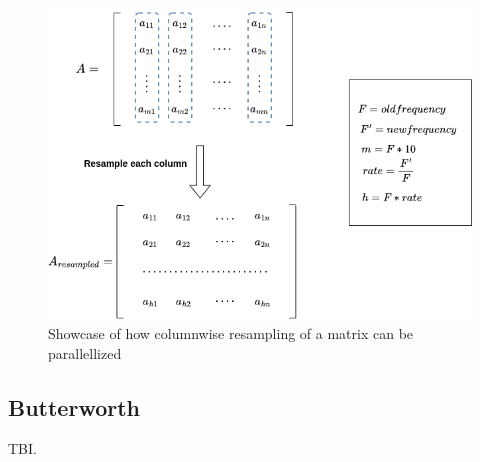 \begin{figure}[h]
    \centering
    \includegraphics[width=0.8\linewidth]{figures/parallel_resample.png}
    \caption{Showcase of how columnwise resampling of a matrix can be parallellized}
    \label{fig:parres}
\end{figure}


\subsection{Butterworth}

TBI.